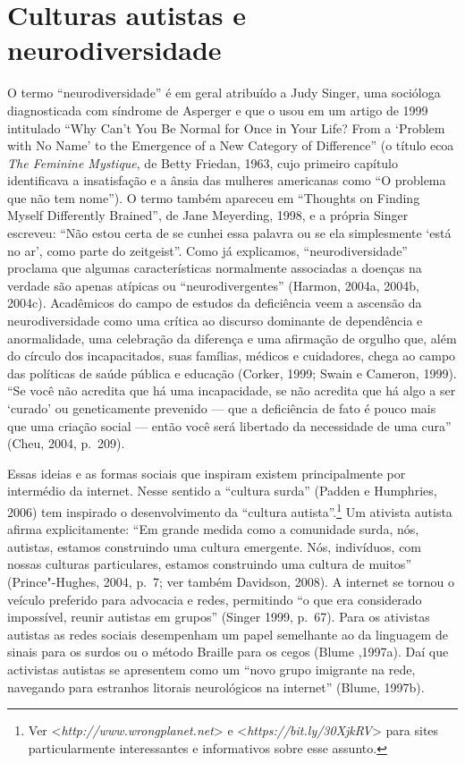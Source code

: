 \chapter{Culturas autistas e neurodiversidade}

O termo ``neurodiversidade'' é em geral atribuído a Judy Singer, uma
socióloga diagnosticada com síndrome de Asperger e que o usou em um
artigo de 1999 intitulado ``Why Can't You Be Normal for Once in Your
Life? From a `Problem with No Name' to the Emergence of a New Category
of Difference'' (o título ecoa \emph{The Feminine Mystique}, de Betty
Friedan, 1963, cujo primeiro capítulo identificava a insatisfação e a
ânsia das mulheres americanas como ``O problema que não tem nome''). O
termo também apareceu em ``Thoughts on Finding Myself Differently
Brained'', de Jane Meyerding, 1998, e a própria Singer escreveu: ``Não
estou certa de se cunhei essa palavra ou se ela simplesmente `está no
ar', como parte do zeitgeist''. Como já explicamos, ``neurodiversidade''
proclama que algumas características normalmente associadas a doenças na
verdade são apenas atípicas ou ``neurodivergentes'' (Harmon, 2004a,
2004b, 2004c). Acadêmicos do campo de estudos da deficiência veem a
ascensão da neurodiversidade como uma crítica ao discurso dominante de
dependência e anormalidade, uma celebração da diferença e uma afirmação
de orgulho que, além do círculo dos incapacitados, suas famílias,
médicos e cuidadores, chega ao campo das políticas de saúde pública e
educação (Corker, 1999; Swain e Cameron, 1999). ``Se você não acredita
que há uma incapacidade, se não acredita que há algo a ser `curado' ou
geneticamente prevenido --- que a deficiência de fato é pouco mais que
uma criação social --- então você será libertado da necessidade de uma
cura'' (Cheu, 2004, p.~209).

Essas ideias e as formas sociais que inspiram existem principalmente por
intermédio da internet. Nesse sentido a ``cultura surda'' (Padden e
Humphries, 2006) tem inspirado o desenvolvimento da ``cultura
autista''.\footnote[17]{Ver \textless{}\emph{http://www.wrongplanet.net}\textgreater{} e
\textless{}\emph{https://bit.ly/30XjkRV}\textgreater{}
para sites particularmente interessantes e informativos sobre esse
assunto.} Um ativista autista afirma
explicitamente: ``Em grande medida como a comunidade surda, nós,
autistas, estamos construindo uma cultura emergente. Nós, indivíduos,
com nossas culturas particulares, estamos construindo uma cultura de
muitos'' (Prince"-Hughes, 2004, p.~7; ver também Davidson, 2008). A
internet se tornou o veículo preferido para advocacia e redes,
permitindo ``o que era considerado impossível, reunir autistas em
grupos'' (Singer 1999, p.~67). Para os ativistas autistas as redes
sociais desempenham um papel semelhante ao da linguagem de sinais para
os surdos ou o método Braille para os cegos (Blume ,1997a). Daí que
activistas autistas se apresentem como um ``novo grupo imigrante na
rede, navegando para estranhos litorais neurológicos na internet''
(Blume, 1997b).

